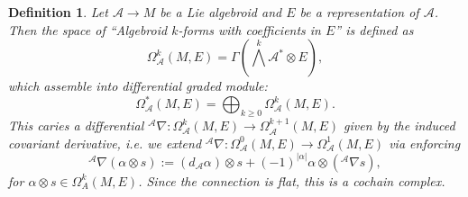 \documentclass{amsart}
\newcommand{\ra}{\rightarrow}
\newtheorem{definition}[theorem]{Definition}
\newcommand{\A}{\mathcal{A}}
\theoremstyle{definition}
\begin{document}
\begin{definition}
    Let $\A \ra M$ be a Lie algebroid and $E$ be a representation of $\A$. Then the space of ``Algebroid $k$-forms with coefficients in $E$'' is defined as
    \begin{equation*}
        \Omega_\A^k(M,E) = \Gamma(\bigwedge^k \A^* \otimes E),
    \end{equation*}
    which assemble into differential graded module:
    \begin{equation*}
        \Omega_\A^*(M,E) = \bigoplus_{k \geq 0} \Omega^k_\A(M,E).
    \end{equation*}
    This caries a differential ${}^\A \nabla:\Omega_\A^k(M,E) \ra \Omega_\A^{k+1}(M,E)$ given by the induced covariant derivative, i.e.  we extend ${}^\A \nabla:\Omega_\A^0(M,E) \ra \Omega_\A^1(M,E)$ via enforcing
\begin{equation*}
    {}^\A\nabla (\alpha \otimes s) :=(d_\A \alpha) \otimes s + (-1)^{|\alpha|}\alpha \otimes ({}^\A \nabla s),
\end{equation*}
for $\alpha \otimes s \in \Omega^k_A(M,E)$. 
Since the connection is flat, this is a cochain complex.
\end{definition}
\end{document}
